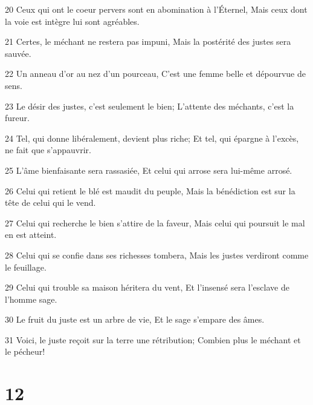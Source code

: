 \par 20 Ceux qui ont le coeur pervers sont en abomination à l'Éternel, Mais ceux dont la voie est intègre lui sont agréables.
\par 21 Certes, le méchant ne restera pas impuni, Mais la postérité des justes sera sauvée.
\par 22 Un anneau d'or au nez d'un pourceau, C'est une femme belle et dépourvue de sens.
\par 23 Le désir des justes, c'est seulement le bien; L'attente des méchants, c'est la fureur.
\par 24 Tel, qui donne libéralement, devient plus riche; Et tel, qui épargne à l'excès, ne fait que s'appauvrir.
\par 25 L'âme bienfaisante sera rassasiée, Et celui qui arrose sera lui-même arrosé.
\par 26 Celui qui retient le blé est maudit du peuple, Mais la bénédiction est sur la tête de celui qui le vend.
\par 27 Celui qui recherche le bien s'attire de la faveur, Mais celui qui poursuit le mal en est atteint.
\par 28 Celui qui se confie dans ses richesses tombera, Mais les justes verdiront comme le feuillage.
\par 29 Celui qui trouble sa maison héritera du vent, Et l'insensé sera l'esclave de l'homme sage.
\par 30 Le fruit du juste est un arbre de vie, Et le sage s'empare des âmes.
\par 31 Voici, le juste reçoit sur la terre une rétribution; Combien plus le méchant et le pécheur!

\chapter{12}

